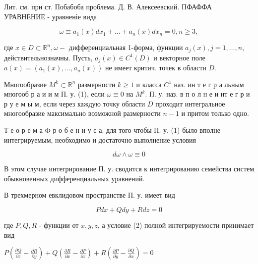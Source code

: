 \documentclass[10pt]{article}
\begin{document}
Лит. см. при ст. Побабоба проблема. Д. В. Алексеевский. ПФАФФА УРАВНЕНИЕ - уравненіе вида



\[

\omega \equiv a_{1}(x) d x_{1}+\ldots+a_{n}(x) d x_{n}=0, n \geqslant 3,

\]



где $x \in D \subset \mathbb{R}^{n}, \omega-$ дифференциальная 1-форма, функции $a_{j}(x), j=1, \ldots, n$, действительнозначны. Пусть, $a_{j}(x) \in C^{1}(D)$ и векторное поле $a(x)=\left(a_{1}(x), \ldots, a_{n}(x)\right)$ не имеет критич. точек в области $D$.



Многообразие $M^{k} \subset \mathbb{R}^{n}$ размерности $k \geqslant 1$ и класса $C^{1}$ наз. ин т е г р а льным многооб р а и и м П. у. (1), если $\omega \equiv 0$ на $M^{k}$. П. у. наз. в п о л н е и нт е г р и р у е м ы м, если через каждую точку области $D$ проходит интегральное многообразие максимально возможной размерности $n-1$ и притом только одно.



Т е о р е м а Ф р о б е н и у с а: для того чтобы П. у. (1) было вполне интегрируемым, необходимо и достаточно выполнение условия



\[

d \omega \wedge \omega \equiv 0

\]



В этом случае интегрирование П. у. сводится к интегрированию семейства систем обыкновенных дифференциальных уравнений.



В трехмерном евклидовом пространстве П. у. имеет вид



\[

P d x+Q d y+R d z=0

\]



где $P, Q, R$ - функции от $x, y, z$, а условие (2) полной интегрируемости принимает вид



$P\left(\frac{\partial Q}{\partial z}-\frac{\partial R}{\partial y}\right)+Q\left(\frac{\partial R}{\partial x}-\frac{\partial P}{\partial z}\right)+R\left(\frac{\partial P}{\partial y}-\frac{\partial Q}{\partial x}\right)=0$
\end{document}
